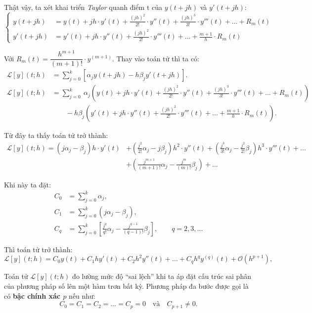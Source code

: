 Thật vậy, ta xét khai triển \textit{Taylor} quanh điểm t của $y(t+jh)$ và $y'(t+jh):$
\[
\left\{
\begin{aligned}
    y(t+jh) &= y(t) + jh\cdot y'(t) + \frac{(jh)^2}{2!} \cdot y''(t) + \frac{(jh)^3}{3!} \cdot y'''(t)+...+R_m(t)\\
    y'(t+jh)&= y'(t) + jh \cdot y''(t) + \frac{(jh)^2}{2!} \cdot y'''(t) +...+\frac{m+1}{h} \cdot R_m(t) 
\end{aligned}
\right.
\]

Với $R_m(t) = \dfrac{h^{m+1}}{(m+1)!}\cdot y^{(m+1)}$. Thay vào toán tử thì ta có:
\[
\begin{aligned}
    \mathcal{L}[y](t; h) &= \sum_{j=0}^{k} \left[ \alpha_j y(t + jh) - h \beta_j y'(t + jh) \right]. \\
    \mathcal{L}[y](t; h) &= \sum_{j=0}^{k} \ \alpha_j \left(y(t) + jh\cdot y'(t) + \frac{(jh)^2}{2!} \cdot y''(t) + \frac{(jh)^3}{3!} \cdot y'''(t)+...+R_m(t)\right) \\
    &   \qquad  - h \beta_j \left(y'(t) + jh \cdot y''(t) + \frac{(jh)^2}{2!} \cdot y'''(t) +...+\frac{m+1}{h} \cdot R_m(t)\right) .
\end{aligned}
\]

Từ đây ta thấy toán tử trở thành:
\[
\begin{aligned}
    \mathcal{L}[y](t; h) =  \left(j\alpha_j-\beta_j\right)h\cdot y'(t) &+  \left(\frac{j^2}{2!}\alpha_j - j\beta_j\right)h^2\cdot y''(t) + \left(\frac{j^3}{3!}\alpha_j-\frac{j^2}{2!}\beta_j\right)h^3\cdot y'''(t)+...\\
    &+\left(\frac{j^{m+1}}{(m+1)!}\alpha_j -\frac{j^{m}}{(m)!}\beta_j\right)+...
\end{aligned}
\]

Khi này ta đặt:
\begin{align*}
    C_0 &= \sum_{j=0}^{k} \alpha_j, \\
    C_1 &= \sum_{j=0}^{k} \left( j\alpha_j - \beta_j \right), \\
    C_q &= \sum_{j=0}^{k} \left[ \frac{j^q}{q!} \alpha_j - \frac{j^{q-1}}{(q-1)!} \beta_j \right], \qquad q = 2, 3, \dots
\end{align*}

Thì toán tử trở thành:
\[
    \mathcal{L}[y](t; h) = C_0 y(t) + C_1 h y'(t) + C_2 h^2 y''(t) + \dots + C_q h^q y^{(q)}(t) + \mathcal{O}(h^{p+1}), 
\]

Toán tử $\mathcal{L}[y](t; h)$ đo lường mức độ ``sai lệch'' khi ta áp đặt cấu trúc sai phân của phương pháp số lên một hàm trơn bất kỳ. Phương pháp đa bước được gọi là có \textbf{bậc chính xác $p$} nếu như:
\[
   C_0 = C_1 = C_2 = \dots = C_p = 0 \quad \text{và} \quad C_{p+1} \neq 0.
\]


